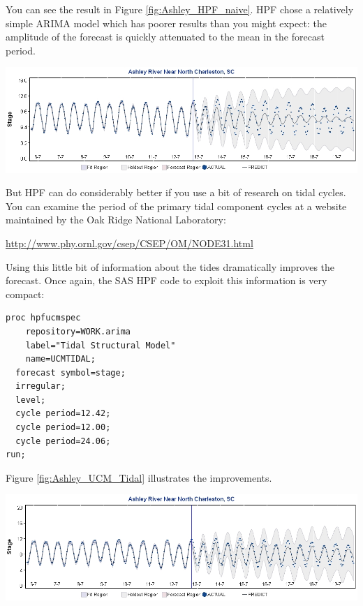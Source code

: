 \documentclass[10pt]{sugconf-ish}
\begin{document}
You can see the result in Figure \ref{fig:Ashley_HPF_naive}. HPF chose a relatively simple ARIMA model which has poorer results than you might expect: the amplitude of the forecast is quickly attenuated to the mean in the forecast period.

\begin{minipage}{\linewidth} 
\centering
\includegraphics[width=6in,keepaspectratio]{AshleyArima.jpg} 
\label{fig:Ashley_HPF_naive}
\end{minipage} 

But HPF can do considerably better if you use a bit of research on tidal cycles. You can examine the period of the primary tidal component cycles at a website maintained by the Oak Ridge National Laboratory:

\hspace*{2em}\url{http://www.phy.ornl.gov/csep/CSEP/OM/NODE31.html}

Using this little bit of information about the tides dramatically improves the forecast. Once again, the SAS HPF code to exploit this information is very compact:

\small
\begin{verbatim}
proc hpfucmspec 
    repository=WORK.arima
    label="Tidal Structural Model"
    name=UCMTIDAL;
  forecast symbol=stage;
  irregular;
  level;
  cycle period=12.42;
  cycle period=12.00;
  cycle period=24.06;
run;
\end{verbatim}
\normalsize

Figure \ref{fig:Ashley_UCM_Tidal} illustrates the improvements.

\begin{minipage}{\linewidth} 
\centering
\includegraphics[width=6in,keepaspectratio]{AshleyStructural.jpg} 
\label{fig:Ashley_UCM_Tidal}
\end{minipage} 
\end{document}
